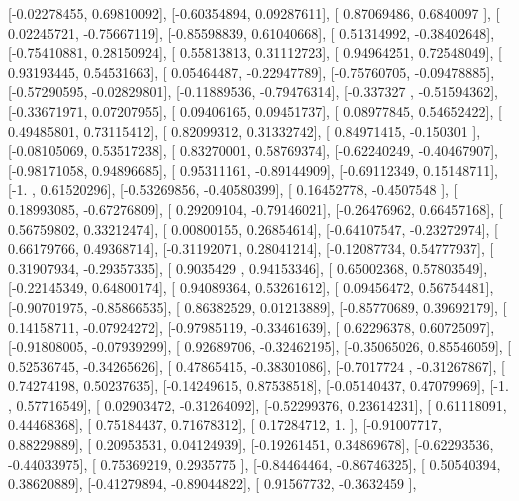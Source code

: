 \documentclass{article}
\begin{document}
       [-0.02278455,  0.69810092],
       [-0.60354894,  0.09287611],
       [ 0.87069486,  0.6840097 ],
       [ 0.02245721, -0.75667119],
       [-0.85598839,  0.61040668],
       [ 0.51314992, -0.38402648],
       [-0.75410881,  0.28150924],
       [ 0.55813813,  0.31112723],
       [ 0.94964251,  0.72548049],
       [ 0.93193445,  0.54531663],
       [ 0.05464487, -0.22947789],
       [-0.75760705, -0.09478885],
       [-0.57290595, -0.02829801],
       [-0.11889536, -0.79476314],
       [-0.337327  , -0.51594362],
       [-0.33671971,  0.07207955],
       [ 0.09406165,  0.09451737],
       [ 0.08977845,  0.54652422],
       [ 0.49485801,  0.73115412],
       [ 0.82099312,  0.31332742],
       [ 0.84971415, -0.150301  ],
       [-0.08105069,  0.53517238],
       [ 0.83270001,  0.58769374],
       [-0.62240249, -0.40467907],
       [-0.98171058,  0.94896685],
       [ 0.95311161, -0.89144909],
       [-0.69112349,  0.15148711],
       [-1.        ,  0.61520296],
       [-0.53269856, -0.40580399],
       [ 0.16452778, -0.4507548 ],
       [ 0.18993085, -0.67276809],
       [ 0.29209104, -0.79146021],
       [-0.26476962,  0.66457168],
       [ 0.56759802,  0.33212474],
       [ 0.00800155,  0.26854614],
       [-0.64107547, -0.23272974],
       [ 0.66179766,  0.49368714],
       [-0.31192071,  0.28041214],
       [-0.12087734,  0.54777937],
       [ 0.31907934, -0.29357335],
       [ 0.9035429 ,  0.94153346],
       [ 0.65002368,  0.57803549],
       [-0.22145349,  0.64800174],
       [ 0.94089364,  0.53261612],
       [ 0.09456472,  0.56754481],
       [-0.90701975, -0.85866535],
       [ 0.86382529,  0.01213889],
       [-0.85770689,  0.39692179],
       [ 0.14158711, -0.07924272],
       [-0.97985119, -0.33461639],
       [ 0.62296378,  0.60725097],
       [-0.91808005, -0.07939299],
       [ 0.92689706, -0.32462195],
       [-0.35065026,  0.85546059],
       [ 0.52536745, -0.34265626],
       [ 0.47865415, -0.38301086],
       [-0.7017724 , -0.31267867],
       [ 0.74274198,  0.50237635],
       [-0.14249615,  0.87538518],
       [-0.05140437,  0.47079969],
       [-1.        ,  0.57716549],
       [ 0.02903472, -0.31264092],
       [-0.52299376,  0.23614231],
       [ 0.61118091,  0.44468368],
       [ 0.75184437,  0.71678312],
       [ 0.17284712,  1.        ],
       [-0.91007717,  0.88229889],
       [ 0.20953531,  0.04124939],
       [-0.19261451,  0.34869678],
       [-0.62293536, -0.44033975],
       [ 0.75369219,  0.2935775 ],
       [-0.84464464, -0.86746325],
       [ 0.50540394,  0.38620889],
       [-0.41279894, -0.89044822],
       [ 0.91567732, -0.3632459 ],
\end{document}
